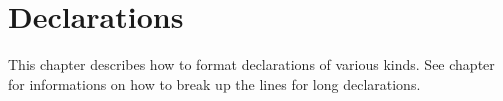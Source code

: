 \chapter{Declarations}
This chapter describes how to format declarations of various kinds. See chapter  for informations on how to break up the lines for long declarations.





